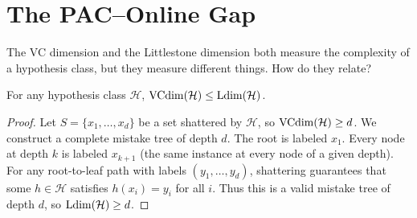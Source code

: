 
\section{The PAC--Online Gap}
\label{sec:pac-online-gap}

The VC dimension and the Littlestone dimension both measure the complexity of a hypothesis class, but they measure different things. How do they relate?

\begin{prop}[$\VC \leq \Ldim$]
\label{prop:vc-leq-ldim}
  \leanok
For any hypothesis class $\mathcal{H}$, $\mathrm{VCdim}(\mathcal{H}) \leq \mathrm{Ldim}(\mathcal{H})$.
\end{prop}

\begin{proof}
Let $S = \{x_1, \ldots, x_d\}$ be a set shattered by $\mathcal{H}$, so $\mathrm{VCdim}(\mathcal{H}) \geq d$. We construct a complete mistake tree of depth $d$. The root is labeled $x_1$. Every node at depth $k$ is labeled $x_{k+1}$ (the same instance at every node of a given depth). For any root-to-leaf path with labels $(y_1, \ldots, y_d)$, shattering guarantees that some $h \in \mathcal{H}$ satisfies $h(x_i) = y_i$ for all $i$. Thus this is a valid mistake tree of depth $d$, so $\mathrm{Ldim}(\mathcal{H}) \geq d$.
\end{proof}

